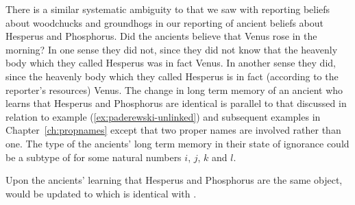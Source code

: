 There is a similar systematic ambiguity to that we saw with reporting
beliefs about woodchucks and groundhogs in our reporting of ancient
beliefs about Hesperus and Phosphorus.  Did the ancients believe that
Venus rose in the morning?  In one sense they did not, since they did
not know that the heavenly body which they called Hesperus was in fact
Venus.  In another sense they did, since the heavenly body which they
called Hesperus is in fact (according to the reporter's resources)
Venus.  The change in long term memory of an ancient who learns that
Hesperus and Phosphorus are identical is parallel to that discussed in
relation to example (\ref{ex:paderewski-unlinked}) and subsequent
examples in
Chapter~\ref{ch:propnames} except that two proper names are involved
rather than one.  The type of the ancients' long term memory in their
state of ignorance could be a subtype of \nexteg{} for some natural
numbers $i$, $j$, $k$ and $l$.
\begin{ex} 

\end{ex}
Upon the ancients' learning that Hesperus and Phosphorus are the same
object, \preveg{} would be updated to  which is identical
with .
